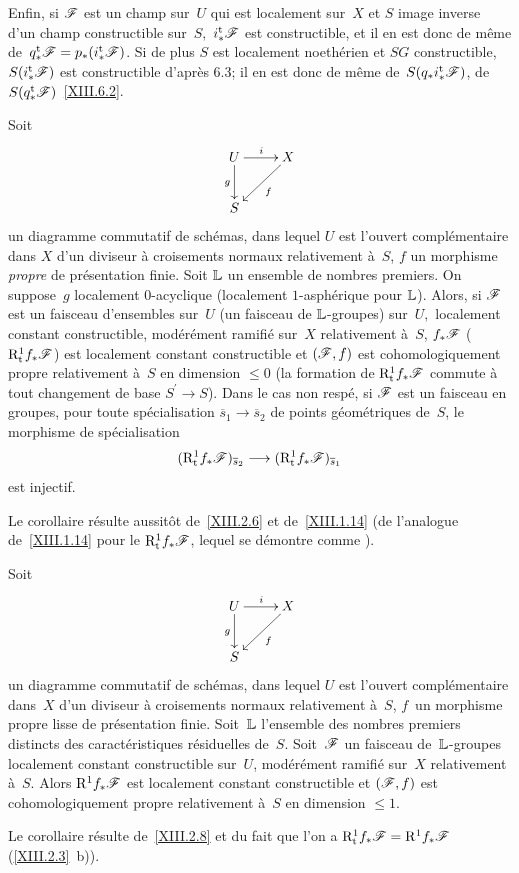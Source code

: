Enfin, si $\cal{ F}$ est un champ sur~$U$ qui est localement sur~$X$ et
$S$ image inverse d'un champ constructible sur~$S,$
$i_*^{\tame}\cal{ F}$ est constructible, et il en est donc de
m\^eme de~$q_*^{\tame}\cal{ F}=p_*(i_*^{\tame}\cal{ F})$. Si
de plus $S$ est localement noeth\'erien et $SG$ constructible,
$S(i_*^{\tame}\cal{ F})$ est constructible d'apr\`es 6.3; il en
est donc de m\^eme de~$S(q_*i_*^{\tame}\cal{ F})$, \ie de
$S(q_*^{\tame}\cal{ F})$~\ref{XIII.6.2}.

\begin{corollaire}
\label{XIII.2.8}
Soit
$$
\xymatrix{{U}\ar[r]^{i}\ar[d]_{g}&{X}\ar[ld]^{f}\\{S}}
$$
un diagramme commutatif de sch\'emas, dans lequel $U$ est l'ouvert
compl\'ementaire
dans $X$ d'un diviseur \`a croisements normaux relativement \`a~$S$, $f$ un morphisme \emph {propre} de pr\'esentation finie. Soit
$\mathbb{L}$ un ensemble de nombres premiers. On suppose~$g$ localement
$0$-acyclique (\resp localement $1$-asph\'erique pour $\mathbb{L}$). Alors, si
$\cal{ F}$ est un faisceau d'ensembles sur~$U$ (\resp un faisceau de
$\mathbb{L}$-groupes) sur~$U,$ localement constant constructible,
mod\'er\'ement ramifi\'e sur~$X$ relativement \`a~$S$,
$f_*\cal{ F}$ (\resp $\R^1_{\tame}f_*\cal{ F}$) est localement
constant constructible et $(\cal{ F},f)$ est cohomologiquement propre
relativement \`a~$S$ en dimension $\leq 0$ (\resp la formation de
$\R^1_{\tame}f_*\cal{ F}$ commute \`a tout changement de base
$S^{'}\to S$). Dans le cas non resp\'e, si $\cal{ F}$ est un
faisceau en groupes, pour toute sp\'ecialisation $\overline{s}_1
\to \overline{s}_2$ de points g\'eom\'etriques de~$S$, le
morphisme de sp\'ecialisation
$$
(\R^1_{\tame}f_*\cal{ F})_{\overline{s}_2}\to
(\R^1_{\tame}f_*\cal{ F})_{\overline{s}_1}
$$
est injectif.
\end{corollaire}
Le corollaire r\'esulte aussit\^ot de~\ref{XIII.2.6} et
de~\ref{XIII.1.14} (\resp de l'analogue de~\ref{XIII.1.14} pour le
$\R^1_{\tame}f_*\cal{ F}$, lequel se d\'emontre comme \loccit).

\begin{corollaire} \label{XIII.2.9}
Soit
$$
\xymatrix{{U}\ar[r]^{i}\ar[d]_{g}&{X}\ar[ld]^{f}\\{S}}
$$
un diagramme commutatif de sch\'emas, dans lequel $U$ est l'ouvert
compl\'ementaire dans~$X$ d'un diviseur \`a croisements normaux
relativement \`a~$S$, $f$~un morphisme propre lisse de
pr\'esentation finie. Soit~$\mathbb{L} $ l'ensemble des nombres premiers
distincts des caract\'eristiques r\'esiduelles de~$S$. Soit~$\cal{F}$ un faisceau de~$\mathbb{L} $-groupes localement constant constructible
sur~$U$, mod\'er\'ement ramifi\'e sur~$X$ relativement
\`a~$S$. Alors $\R^1 f_*\cal{ F}$ est localement constant
constructible et $(\cal{ F},f)$ est cohomologiquement propre
relativement
\`a~$S$ en dimension $\leq 1$.
\end{corollaire}
Le corollaire r\'esulte de~\ref{XIII.2.8} et du fait que l'on a
$\R_{\tame}^1f_*\cal{ F}=\R^1f_*\cal{ F}$ (\ref{XIII.2.3}~b)).

